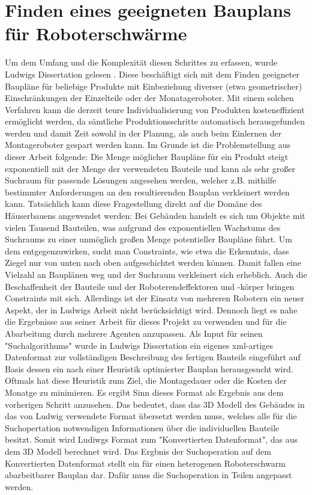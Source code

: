 \section{Finden eines geeigneten Bauplans für Roboterschwärme}
Um dem Umfang und die Komplexität diesen Schrittes zu erfassen, wurde Ludwigs Dissertation gelesen \cite{Naegele2021}.
Diese beschäftigt sich mit dem Finden geeigneter Baupläne für beliebige Produkte mit Einbeziehung diverser (etwa geometrischer) Einschränkungen der Einzelteile oder der Monatageroboter.
Mit einem solchen Verfahren kann die derzeit teure Individualisierung von Produkten kosteneffizient ermöglicht werden, da sämtliche Produktionsschritte automatisch herausgefunden werden und damit Zeit sowohl in der Planung, als auch beim Einlernen der Montageroboter gespart werden kann.
Im Grunde ist die Problemstellung aus dieser Arbeit folgende:
Die Menge möglicher Baupläne für ein Produkt steigt exponentiell mit der Menge der verwendeten Bauteile und kann als sehr großer Suchraum für passende Lösungen angesehen werden, welcher z.B. mithilfe bestimmter Anforderungen an den resultierenden Bauplan verkleinert werden kann.
Tatsächlich kann diese Fragestellung direkt auf die Domäne des Häuserbauens angewendet werden:
Bei Gebäuden handelt es sich um Objekte mit vielen Tausend Bauteilen, was aufgrund des exponentiellen Wachstums des Suchraums zu einer unmöglich großen Menge potentieller Baupläne führt.
Um dem entgegenzuwirken, sucht man Constraints, wie etwa die Erkenntnis, dass Ziegel nur von unten nach oben aufgeschichtet werden können.
Damit fallen eine Vielzahl an Bauplänen weg und der Suchraum verkleinert sich erheblich.
Auch die Beschaffenheit der Bauteile und der Roboterendeffektoren und -körper bringen Constraints mit sich.
Allerdings ist der Einsatz von mehreren Robotern ein neuer Aspekt, der in Ludwigs Arbeit nicht berücksichtigt wird.
Dennoch liegt es nahe die Ergebnisse aus seiner Arbeit für dieses Projekt zu verwenden und für die Abarbeitung durch mehrere Agenten anzupassen.
Als Input für seinen "Suchalgorithums" wurde in Ludwigs Dissertation ein eigenes xml-artiges Datenformat zur vollständigen Beschreibung des fertigen Bauteils eingeführt auf Basis dessen ein nach einer Heuristik optimierter Bauplan herausgesucht wird.
Oftmals hat diese Heuristik zum Ziel, die Montagedauer oder die Kosten der Monatge zu minimieren.
Es ergibt Sinn dieses Format als Ergebnis aus dem vorherigen Schritt anzusehen.
Das bedeutet, dass das 3D Modell des Gebäudes in das von Ludwig verwendete Format übersetzt werden muss, welches alle für die Suchopertation notwendigen Informationen über die individuellen Bauteile besitzt.
Somit wird Ludiwgs Format zum "Konvertierten Datenformat", das aus dem 3D Modell berechnet wird.
Das Ergbnis der Suchoperation auf dem Konvertierten Datenformat stellt ein für einen heterogenen Roboterschwarm abarbeitbarer Bauplan dar.
Dafür muss die Suchoperation in Teilen angepasst werden.

